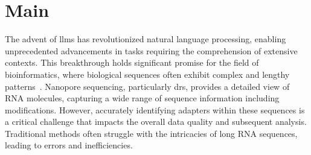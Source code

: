 \documentclass[pdflatex, sn-mathphys-num, lineno]{sn-jnl}%
\theoremstyle{thmstyleone}%
\theoremstyle{thmstyletwo}%
\theoremstyle{thmstylethree}%
\begin{document}
\maketitle
\section{Main}\label{sec1}




The advent of \glspl{llm} has revolutionized natural language processing, enabling unprecedented advancements in tasks requiring the comprehension of extensive contexts.
This breakthrough holds significant promise for the field of bioinformatics, where biological sequences often exhibit complex and lengthy patterns~\cite{consens2023transformers}.
Nanopore sequencing, particularly \gls{drs}, provides a detailed view of RNA molecules, capturing a wide range of sequence information including modifications.
However, accurately identifying adapters within these sequences is a critical challenge that impacts the overall data quality and subsequent analysis.
Traditional methods often struggle with the intricacies of long RNA sequences, leading to errors and inefficiencies.
\end{document}
